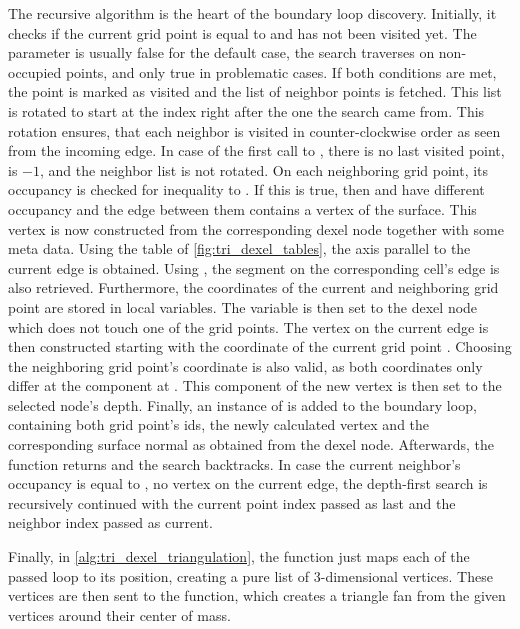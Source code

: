 The recursive  algorithm is the heart of the boundary loop discovery.
Initially, it checks if the current grid point is equal to  and has not been visited yet.
The parameter  is usually false for the default case, \ie the search traverses on non-occupied points, and only true in problematic cases.
If both conditions are met, the point is marked as visited and the list of neighbor points is fetched.
This list is rotated to start at the index right after the one the search came from.
This rotation ensures, that each neighbor is visited in counter-clockwise order as seen from the incoming edge.
In case of the first call to , there is no last visited point,  is $-1$, and the neighbor list is not rotated.
On each neighboring grid point, its occupancy is checked for inequality to .
If this is true, then  and  have different occupancy and the edge between them contains a vertex of the surface.
This vertex is now constructed from the corresponding dexel node together with some meta data.
Using the  table of \cref{fig:tri_dexel_tables}, the axis parallel to the current edge is obtained.
Using , the segment on the corresponding cell's edge is also retrieved.
Furthermore, the coordinates of the current and neighboring grid point are stored in local variables.
The  variable is then set to the dexel node which does not touch one of the grid points.
The vertex on the current edge is then constructed starting with the coordinate of the current grid point .
Choosing the neighboring grid point's coordinate is also valid, as both coordinates only differ at the component at .
This component of the new vertex is then set to the selected node's depth.
Finally, an instance of  is added to the boundary loop, containing both grid point's ids, the newly calculated vertex and the corresponding surface normal as obtained from the dexel node.
Afterwards, the function returns and the search backtracks.
In case the current neighbor's occupancy is equal to , \ie no vertex on the current edge, the depth-first search is recursively continued with the current point index passed as last and the neighbor index passed as current.

Finally, in \cref{alg:tri_dexel_triangulation}, the  function just maps each  of the passed loop to its position, creating a pure list of 3-dimensional vertices.
These vertices are then sent to the  function, which creates a triangle fan from the given vertices around their center of mass.

